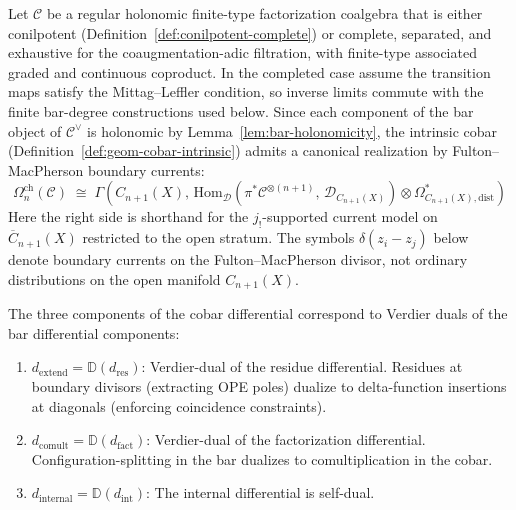 \begin{theorem}%
\label{thm:cobar-distributional-model}
Let $\mathcal{C}$ be a regular holonomic finite-type factorization
coalgebra that is either conilpotent
(Definition~\ref{def:conilpotent-complete}) or complete, separated, and
exhaustive for the coaugmentation-adic filtration, with finite-type
associated graded and continuous coproduct. In the completed case assume
the transition maps satisfy the Mittag--Leffler condition, so inverse
limits commute with the finite bar-degree constructions used below.
Since each component of the bar object of $\mathcal{C}^{\vee}$ is
holonomic by Lemma~\ref{lem:bar-holonomicity}, the intrinsic cobar
(Definition~\ref{def:geom-cobar-intrinsic}) admits a canonical
realization by Fulton--MacPherson boundary currents:
\[
\Omega^{\mathrm{ch}}_n(\mathcal{C})
\;\cong\;
\Gamma\!\left(C_{n+1}(X),\,
 \mathrm{Hom}_{\mathcal{D}}\!\left(\pi^*\mathcal{C}^{\otimes(n+1)},\,
 \mathcal{D}_{C_{n+1}(X)}\right)
 \otimes \Omega^*_{C_{n+1}(X),\mathrm{dist}}
\right)
\]
Here the right side is shorthand for the $j_!$-supported current model
on $\overline{C}_{n+1}(X)$ restricted to the open stratum. The symbols
$\delta(z_i-z_j)$ below denote boundary currents on the
Fulton--MacPherson divisor, not ordinary distributions on the open
manifold $C_{n+1}(X)$.

The three components of the cobar differential correspond to
Verdier duals of the bar differential components:
\begin{enumerate}[label=\textup{(\roman*)}]
\item $d_{\mathrm{extend}} = \mathbb{D}(d_{\mathrm{res}})$:
 Verdier-dual of the residue differential. Residues at boundary
 divisors (extracting OPE poles) dualize to delta-function insertions
 at diagonals (enforcing coincidence constraints).
\item $d_{\mathrm{comult}} = \mathbb{D}(d_{\mathrm{fact}})$:
 Verdier-dual of the factorization differential. Configuration-splitting
 in the bar dualizes to comultiplication in the cobar.
\item $d_{\mathrm{internal}} = \mathbb{D}(d_{\mathrm{int}})$:
 The internal differential is self-dual.
\end{enumerate}
\end{theorem}

